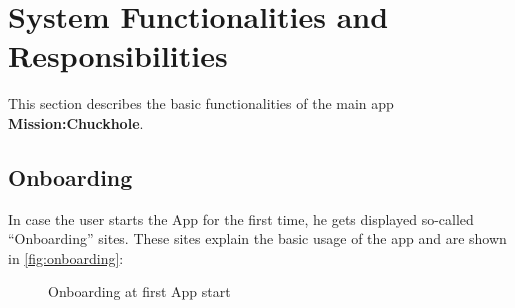 \documentclass[10pt,a4paper]{article} %
\begin{document}
    
    \section{System Functionalities and Responsibilities}

	This section describes the basic functionalities of the main app \textbf{Mission:Chuckhole}.



	\subsection{Onboarding}
		In case the user starts the App for the first time, he gets displayed so-called ``Onboarding'' sites.
		These sites explain the basic usage of the app and are shown in \autoref{fig:onboarding}:


	\begin{figure}[H]
	  \centering
	  \hfill
	  \hfill
	  \caption{Onboarding at first App start}
	  \label{fig:onboarding}
	\end{figure}
\end{document}
